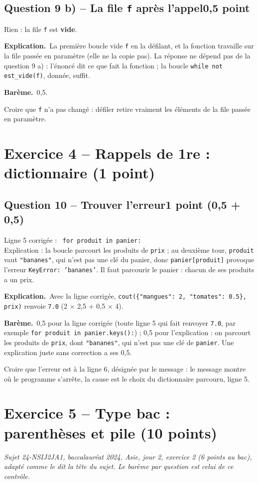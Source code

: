 \documentclass[11pt, a4paper]{exam}
\newcommand{\code}[1]{\texttt{#1}}
\newcommand{\Qt}[2]{\par\needspace{10\baselineskip}\subsection*{#1\hfill{\normalfont\small #2}}}
\newcommand{\bareme}[1]{\par\noindent\textbf{Barème.}\ #1\par\smallskip}
\newcommand{\explication}{\noindent\textbf{Explication.}\ }
\begin{document}
\Qt{Question 9 b) -- La file \code{f} après l'appel}{0,5 point}
\begin{reponse}
Rien : la file \code{f} est \textbf{vide}.
\end{reponse}
\explication La première boucle vide \code{f} en la défilant, et la fonction travaille sur la file passée en paramètre (elle ne la copie pas). La réponse ne dépend pas de la question 9 a) : l'énoncé dit ce que fait la fonction ; la boucle \code{while not est\_vide(f)}, donnée, suffit.
\bareme{0,5.}
\begin{erreur}
Croire que \code{f} n'a pas changé : défiler retire vraiment les éléments de la file passée en paramètre.
\end{erreur}

\section*{Exercice 4 -- Rappels de 1re : dictionnaire (1 point)}

\Qt{Question 10 -- Trouver l'erreur}{1 point (0,5 + 0,5)}
\begin{reponse}
Ligne 5 corrigée : \code{    for produit in panier:}\\
Explication : la boucle parcourt les produits de \code{prix} ; au deuxième tour, \code{produit} vaut \code{"bananes"}, qui n'est pas une clé du panier, donc \code{panier[produit]} provoque l'erreur \code{KeyError: 'bananes'}. Il faut parcourir le panier : chacun de ses produits a un prix.
\end{reponse}
\explication Avec la ligne corrigée, \code{cout(\{"mangues": 2, "tomates": 0.5\}, prix)} renvoie \code{7.0} (2 × 2,5 + 0,5 × 4).
\bareme{0,5 pour la ligne corrigée (toute ligne 5 qui fait renvoyer \code{7.0}, par exemple \code{for produit in panier.keys():}) ; 0,5 pour l'explication : on parcourt les produits de \code{prix}, dont \code{"bananes"}, qui n'est pas une clé de \code{panier}. Une explication juste sans correction a ses 0,5.}
\begin{erreur}
Croire que l'erreur est à la ligne 6, désignée par le message : le message montre où le programme s'arrête, la cause est le choix du dictionnaire parcouru, ligne 5.
\end{erreur}

\section*{Exercice 5 -- Type bac : parenthèses et pile (10 points)}
\begin{center}\footnotesize\itshape Sujet 24-NSIJ2JA1, baccalauréat 2024, Asie, jour 2, exercice 2 (6 points au bac), adapté comme le dit la tête du sujet. Le barème par question est celui de ce contrôle.\end{center}
\end{document}
